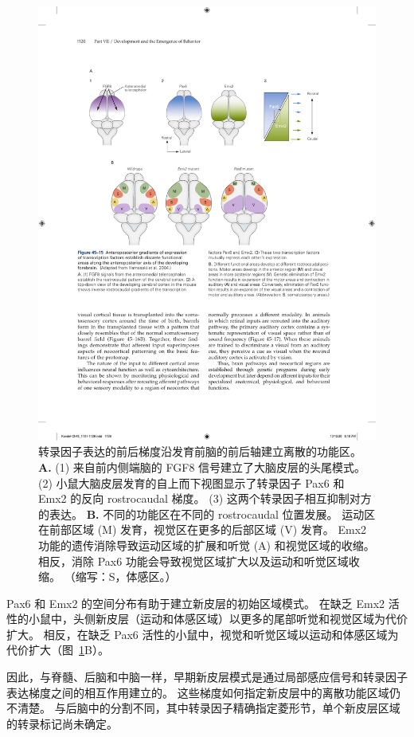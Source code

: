 \begin{figure}[htbp]
	\centering
	\includegraphics[width=0.9\linewidth]{chap45/fig_45_15}
	\caption{转录因子表达的前后梯度沿发育前脑的前后轴建立离散的功能区\cite{hamasaki2004emx2}。
		\textbf{A.} (1) 来自前内侧端脑的 FGF8 信号建立了大脑皮层的头尾模式。
		(2) 小鼠大脑皮层发育的自上而下视图显示了转录因子 Pax6 和 Emx2 的反向 rostrocaudal 梯度。
		(3) 这两个转录因子相互抑制对方的表达。
		\textbf{B.} 不同的功能区在不同的 rostrocaudal 位置发展。
		运动区在前部区域 (M) 发育，视觉区在更多的后部区域 (V) 发育。
		Emx2 功能的遗传消除导致运动区域的扩展和听觉 (A) 和视觉区域的收缩。
		相反，消除 Pax6 功能会导致视觉区域扩大以及运动和听觉区域收缩。 （缩写：S，体感区。）}
	\label{fig:45_15}
\end{figure}


Pax6 和 Emx2 的空间分布有助于建立新皮层的初始区域模式。
在缺乏 Emx2 活性的小鼠中，头侧新皮层（运动和体感区域）以更多的尾部听觉和视觉区域为代价扩大。
相反，在缺乏 Pax6 活性的小鼠中，视觉和听觉区域以运动和体感区域为代价扩大（图~\ref{fig:45_15}B）。


因此，与脊髓、后脑和中脑一样，早期新皮层模式是通过局部感应信号和转录因子表达梯度之间的相互作用建立的。
这些梯度如何指定新皮层中的离散功能区域仍不清楚。
与后脑中的分割不同，其中转录因子精确指定菱形节，单个新皮层区域的转录标记尚未确定。



